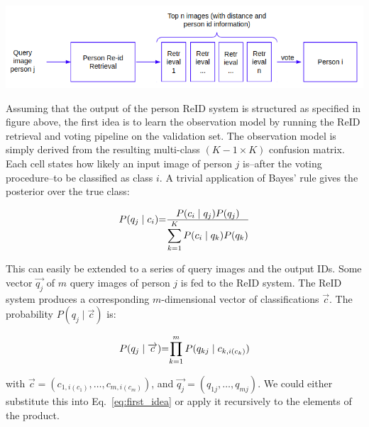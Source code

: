 \documentclass[10pt,a4paper,final]{article}
\begin{document}
\includegraphics[width=\textwidth]{figures/first_idea.png}

Assuming that the output of the person ReID system is structured as specified in figure above, the first idea is to learn the observation model by running the ReID retrieval and voting pipeline on the validation set. The observation model is simply derived from the resulting multi-class $(K-1 \times K)$ confusion matrix. Each cell states how likely an input image of person $j$ is--after the voting procedure--to be classified as class $i$. A trivial application of Bayes' rule gives the posterior over the true class:

\begin{equation}
	\label{eq:first_idea}
	\begin{tabular}{r@{=}l}
		$P(q_j \mid c_i)$ & $\frac{\displaystyle P(c_i \mid q_j) P(q_j)}{\displaystyle\sum_{k=1}^{K} P(c_i \mid q_k) P(q_k)}$ \\ 
	\end{tabular}
\end{equation}

This can easily be extended to a series of query images and the output IDs. Some vector $\overrightarrow{q_j}$ of $m$ query images of person $j$ is fed to the ReID system. The ReID system produces a corresponding $m$-dimensional vector of classifications $\overrightarrow{c}$. The probability $P(q_j \mid \overrightarrow{c})$ is:

\begin{equation}
	\label{eq:joint_first_idea}
	\begin{tabular}{r@{=}l}
	$P(q_j \mid \overrightarrow{c})$ & $\displaystyle \prod_{k=1}^{m} P(q_{kj} \mid c_{k,i(c_k)})$ \\ 
	\end{tabular}
\end{equation}

\noindent with $\overrightarrow{c} = (c_{1,i(c_1)}, \ldots, c_{m,i(c_m)})$, and $\overrightarrow{q_j} = (q_{1j}, \ldots, q_{mj})$. We could either substitute this into Eq.~\ref{eq:first_idea} or apply it recursively to the elements of the product.%
\end{document}
